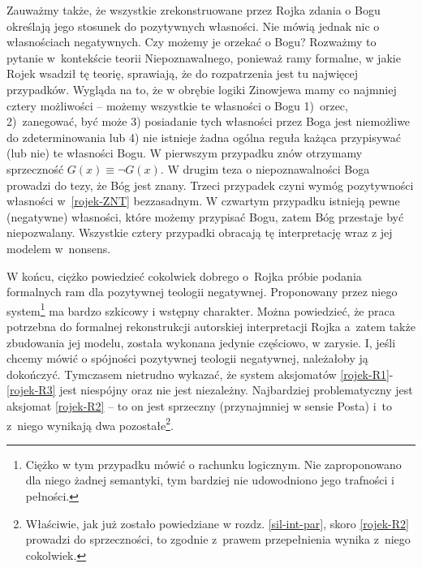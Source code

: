 Zauważmy także, że wszystkie zrekonstruowane przez Rojka zdania o Bogu określają jego stosunek
do pozytywnych własności. Nie mówią jednak nic o własnościach negatywnych.
Czy możemy je orzekać o Bogu? Rozważmy to pytanie w~kontekście teorii Niepoznawalnego,
ponieważ ramy formalne, w jakie Rojek wsadził tę teorię, sprawiają, że do rozpatrzenia jest
tu najwięcej przypadków. Wygląda na to, że w obrębie logiki Zinowjewa mamy co najmniej
cztery możliwości – możemy wszystkie te własności o Bogu 1)~orzec, 2)~zanegować,
być może 3) posiadanie tych własności przez Boga jest niemożliwe do zdeterminowania lub
4) nie istnieje żadna ogólna reguła każąca przypisywać (lub nie) te własności Bogu.
W pierwszym przypadku znów otrzymamy sprzeczność $G(x) \equiv \neg G(x)$. W drugim teza o niepoznawalności
Boga prowadzi do tezy, że Bóg jest znany. Trzeci przypadek czyni wymóg pozytywności własności
w~\ref{rojek-ZNT} bezzasadnym. W czwartym przypadku istnieją pewne (negatywne) własności, które możemy przypisać Bogu, zatem Bóg przestaje być niepozwalany. Wszystkie cztery przypadki obracają tę interpretację
wraz z jej modelem w~nonsens.



W końcu, ciężko powiedzieć cokolwiek dobrego o~Rojka próbie podania formalnych ram
dla pozytywnej teologii negatywnej. Proponowany przez niego system\footnote{Ciężko w
tym przypadku mówić o rachunku logicznym. Nie zaproponowano dla niego
żadnej semantyki, tym bardziej nie udowodniono jego trafności i
pełności.} 
ma bardzo szkicowy i wstępny charakter.
Można powiedzieć, że praca potrzebna do formalnej rekonstrukcji autorskiej interpretacji Rojka
a~zatem także zbudowania jej modelu, została wykonana
jedynie częściowo, w zarysie. I, jeśli chcemy mówić o spójności
pozytywnej teologii negatywnej, należałoby ją dokończyć.
Tymczasem nietrudno wykazać, że system aksjomatów
\eqref{rojek-R1}-\eqref{rojek-R3} jest niespójny oraz nie jest niezależny.
Najbardziej problematyczny jest aksjomat \eqref{rojek-R2} -- to on jest sprzeczny (przynajmniej w sensie Posta)
i~to z~niego wynikają dwa pozostałe\footnote{Właściwie, jak już zostało powiedziane w rozdz. \ref{sil-int-par}, skoro \eqref{rojek-R2} prowadzi do sprzeczności, to zgodnie z~prawem przepełnienia wynika z~niego cokolwiek.}.



